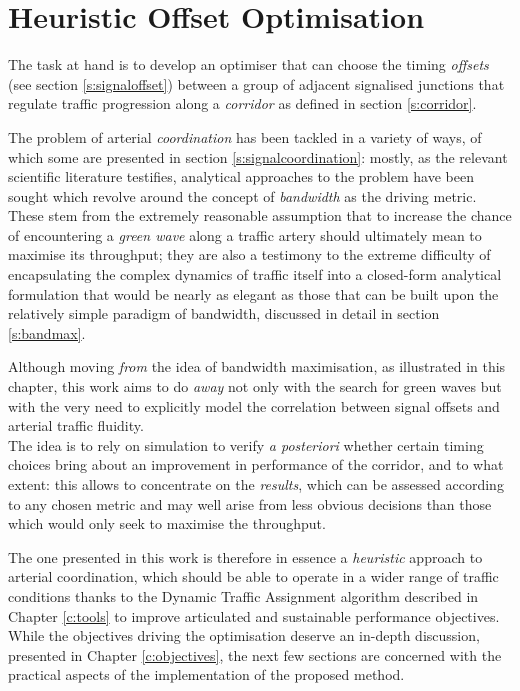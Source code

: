 \section{Heuristic Offset Optimisation}
The task at hand is to develop an optimiser that can choose the timing \emph{offsets} (see section \ref{s:signaloffset}) between a group of adjacent signalised junctions that regulate traffic progression along a \emph{corridor} as defined in section \ref{s:corridor}.

The problem of arterial \emph{coordination} has been tackled in a variety of ways, of which some are presented in section \ref{s:signalcoordination}: mostly, as the relevant scientific literature testifies, analytical approaches to the problem have been sought which revolve around the concept of \emph{bandwidth} as the driving metric. These stem  from the extremely reasonable assumption that to increase the chance of encountering a \emph{green wave} along a traffic artery should ultimately mean to maximise its throughput; they are also a testimony to the extreme difficulty of encapsulating the complex dynamics of traffic itself into a closed-form analytical formulation that would be nearly as elegant as those that can be built upon the relatively simple paradigm of bandwidth, discussed in detail in section \ref{s:bandmax}.

Although moving \emph{from} the idea of bandwidth maximisation, as illustrated in this chapter, this work aims to do \emph{away} not only with the search for green waves but with the very need to explicitly model the correlation between signal offsets and arterial traffic fluidity. \\
The idea is to rely on simulation to verify \emph{a posteriori} whether certain timing choices bring about an improvement in performance of the corridor, and to what extent: this allows to concentrate on the \emph{results}, which can be assessed according to any chosen metric and may well arise from less obvious decisions than those which would only seek to maximise the throughput.

The one presented in this work is therefore in essence a \emph{heuristic} approach to arterial coordination, which should be able to operate in a wider range of traffic conditions thanks to the Dynamic Traffic Assignment algorithm described in Chapter \ref{c:tools} to improve articulated and sustainable performance objectives. While the objectives driving the optimisation deserve an in-depth discussion, presented in Chapter \ref{c:objectives}, the next few sections are concerned with the practical aspects of the implementation of the proposed method.


